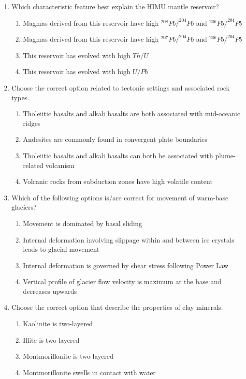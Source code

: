 \documentclass[journal,12pt,onecolumn]{IEEEtran}
\theoremstyle{remark}
\begin{document}
\begin{enumerate}
\item Which characteristic feature best explain the HIMU mantle reservoir? \hfill{}
\begin{enumerate}
    \item Magmas derived from this reservoir have high $^{208}Pb/^{204}Pb$ and $^{206}Pb/^{204}Pb$
    \item Magmas derived from this reservoir have high $^{207}Pb/^{204}Pb$ and $^{206}Pb/^{204}Pb$
    \item This reservoir has evolved with high $Th/U$
    \item This reservoir has evolved with high $U/Pb$
\end{enumerate}

\item Choose the correct option related to tectonic settings and associated rock types. \hfill{}
\begin{enumerate}
    \item Tholeiitic basalts and alkali basalts are both associated with mid-oceanic ridges
    \item Andesites are commonly found in convergent plate boundaries
    \item Tholeiitic basalts and alkali basalts can both be associated with plume-related volcanism
    \item Volcanic rocks from subduction zones have high volatile content
\end{enumerate}

\item Which of the following options is/are correct for movement of warm-base glaciers? \hfill{}
\begin{enumerate}
    \item Movement is dominated by basal sliding
    \item Internal deformation involving slippage within and between ice crystals leads to glacial movement
    \item Internal deformation is governed by shear stress following Power Law
    \item Vertical profile of glacier flow velocity is maximum at the base and decreases upwards
\end{enumerate}

\item Choose the correct option that describe the properties of clay minerals. \hfill{}
\begin{enumerate}
    \item Kaolinite is two-layered
    \item Illite is two-layered
    \item Montmorillonite is two-layered
    \item Montmorillonite swells in contact with water
\end{enumerate}


\end{enumerate}
\end{document}
